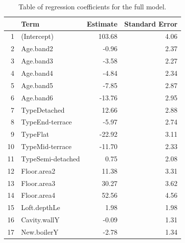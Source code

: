 \documentclass[8pt]{extarticle}
\begin{document}
\begin{table}[H]
	\centering
	\begin{tabular}{r|lrr}
		\hline
		& Term & Estimate & Standard Error \\ 
		\hline
		1 & (Intercept) & 103.68 & 4.06 \\ 
		2 & Age.band2 & -0.96 & 2.37 \\ 
		3 & Age.band3 & -3.58 & 2.27 \\ 
		4 & Age.band4 & -4.84 & 2.34 \\ 
		5 & Age.band5 & -7.85 & 2.87 \\ 
		6 & Age.band6 & -13.76 & 2.95 \\ 
		7 & TypeDetached & 12.66 & 2.88 \\ 
		8 & TypeEnd-terrace & -5.97 & 2.74 \\ 
		9 & TypeFlat & -22.92 & 3.11 \\ 
		10 & TypeMid-terrace & -11.70 & 2.33 \\ 
		11 & TypeSemi-detached & 0.75 & 2.08 \\ 
		12 & Floor.area2 & 11.38 & 3.31 \\ 
		13 & Floor.area3 & 30.27 & 3.62 \\ 
		14 & Floor.area4 & 52.56 & 4.56 \\ 
		15 & Loft.depthLe & 1.98 & 1.98 \\ 
		16 & Cavity.wallY & -0.09 & 1.31 \\ 
		17 & New.boilerY & -2.78 & 1.34 \\ 
		\hline
	\end{tabular}
\caption{Table of regression coefficients for the full model.}
\label{tab:fulmo}
\end{table}
\end{document}
